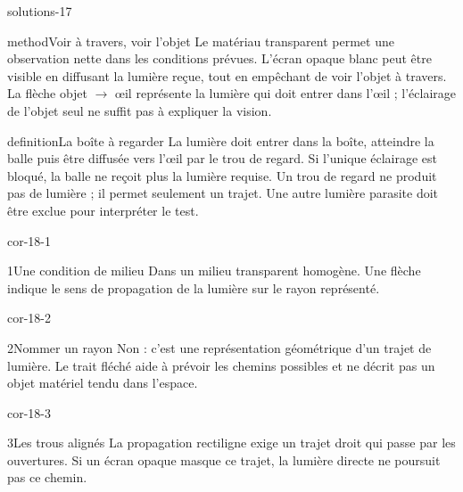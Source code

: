 \documentclass[12pt,twoside,openany]{book}
\begin{document}
\label{solutions-17}
\begin{pcFiche}{solutions-17}
\begin{pcEncadre}{method}{Voir à travers, voir l’objet}
Le matériau transparent permet une observation nette dans les conditions prévues. L’écran opaque blanc peut être visible en diffusant la lumière reçue, tout en empêchant de voir l’objet à travers. La flèche objet \(\rightarrow\) œil représente la lumière qui doit entrer dans l’œil ; l’éclairage de l’objet seul ne suffit pas à expliquer la vision.\par
\end{pcEncadre}
\label{defi-cor-17}
\begin{pcEncadre}{definition}{La boîte à regarder}
La lumière doit entrer dans la boîte, atteindre la balle puis être diffusée vers l’œil par le trou de regard. Si l’unique éclairage est bloqué, la balle ne reçoit plus la lumière requise. Un trou de regard ne produit pas de lumière ; il permet seulement un trajet. Une autre lumière parasite doit être exclue pour interpréter le test.\par
\end{pcEncadre}
\end{pcFiche}
\clearpage{}
\begin{blocLivre}{cor-18-1}
\begin{corrige}{1}{Une condition de milieu}
Dans un milieu transparent homogène. Une flèche indique le sens de propagation de la lumière sur le rayon représenté.\par
\end{corrige}\end{blocLivre}
\begin{blocLivre}{cor-18-2}
\begin{corrige}{2}{Nommer un rayon}
Non : c’est une représentation géométrique d’un trajet de lumière. Le trait fléché aide à prévoir les chemins possibles et ne décrit pas un objet matériel tendu dans l’espace.\par
\end{corrige}\end{blocLivre}
\begin{blocLivre}{cor-18-3}
\begin{corrige}{3}{Les trous alignés}
La propagation rectiligne exige un trajet droit qui passe par les ouvertures. Si un écran opaque masque ce trajet, la lumière directe ne poursuit pas ce chemin.\par
{}
\end{corrige}\end{blocLivre}
\end{document}
